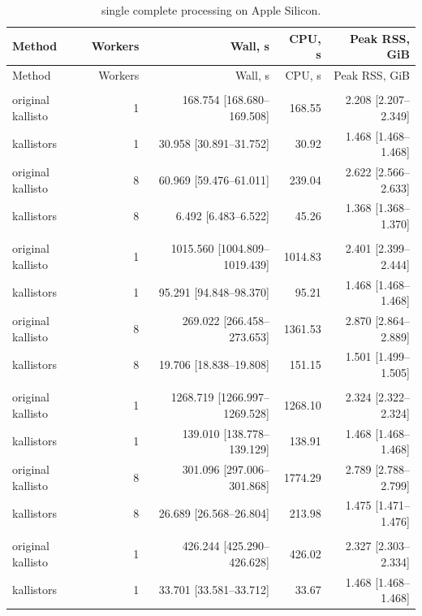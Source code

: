 \begingroup
\small
\setlength{\tabcolsep}{4pt}
\begin{longtable}{@{}lrrrr@{}}
\caption{single complete processing on Apple Silicon.}\label{tab:paper-single}\\
\toprule
Method & Workers & Wall, s & CPU, s & Peak RSS, GiB \\
\midrule
\endfirsthead
\toprule
Method & Workers & Wall, s & CPU, s & Peak RSS, GiB \\
\midrule
\endhead
\bottomrule
\endfoot
\addlinespace
\multicolumn{5}{@{}l}{\textit{gencode: SRR13638690}} \\
original kallisto & 1 & 168.754 [168.680--169.508] & 168.55 & 2.208 [2.207--2.349] \\
kallistors & 1 & 30.958 [30.891--31.752] & 30.92 & 1.468 [1.468--1.468] \\
original kallisto & 8 & 60.969 [59.476--61.011] & 239.04 & 2.622 [2.566--2.633] \\
kallistors & 8 & 6.492 [6.483--6.522] & 45.26 & 1.368 [1.368--1.370] \\
\addlinespace
\multicolumn{5}{@{}l}{\textit{gencode: SRR1039508}} \\
original kallisto & 1 & 1015.560 [1004.809--1019.439] & 1014.83 & 2.401 [2.399--2.444] \\
kallistors & 1 & 95.291 [94.848--98.370] & 95.21 & 1.468 [1.468--1.468] \\
original kallisto & 8 & 269.022 [266.458--273.653] & 1361.53 & 2.870 [2.864--2.889] \\
kallistors & 8 & 19.706 [18.838--19.808] & 151.15 & 1.501 [1.499--1.505] \\
\addlinespace
\multicolumn{5}{@{}l}{\textit{gencode: SRR307903}} \\
original kallisto & 1 & 1268.719 [1266.997--1269.528] & 1268.10 & 2.324 [2.322--2.324] \\
kallistors & 1 & 139.010 [138.778--139.129] & 138.91 & 1.468 [1.468--1.468] \\
original kallisto & 8 & 301.096 [297.006--301.868] & 1774.29 & 2.789 [2.788--2.799] \\
kallistors & 8 & 26.689 [26.568--26.804] & 213.98 & 1.475 [1.471--1.476] \\
\addlinespace
\multicolumn{5}{@{}l}{\textit{gencode: fragment-truth}} \\
original kallisto & 1 & 426.244 [425.290--426.628] & 426.02 & 2.327 [2.303--2.334] \\
kallistors & 1 & 33.701 [33.581--33.712] & 33.67 & 1.468 [1.468--1.468] \\

\end{longtable}
